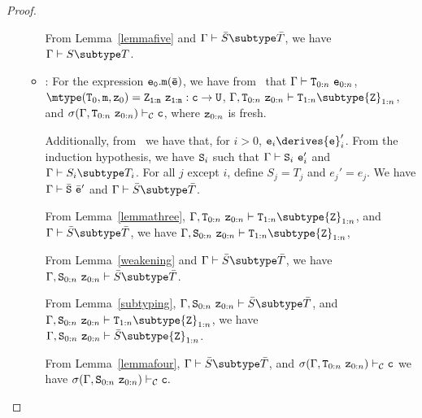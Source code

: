 \begin{proof}
\begin{itemize}
\begin{itemize}
            From Lemma~\ref{lemmafive} and
            $\Gamma \vdash \bar{S} \subtype \bar{T}$, we have
            $\Gamma \vdash S \subtype T$.
   \item
   \RCInvkArg: For the expression ${\tt e_0.m(\bar{e})}$,
            we have from \TInvk\ that
            $\Gamma \vdash {\tt T}_{0:n} \ {\tt e}_{0:n}$,
            $\mtype({\tt T}_0,{\tt m},{\tt z}_0) = 
               \tt {\tt Z}_{1:n}\ {\tt z}_{1:n}:c \rightarrow {\tt U}$,
            $\Gamma, {\tt T}_{0:n}\ {\tt z}_{0:n} \vdash 
                  {\tt T}_{1:n} \subtype {\tt Z}_{1:n}$, and
            $\sigma(\Gamma, {\tt T}_{0:n}\ {\tt z}_{0:n}) \vdash_{\cal C}                          {\tt c}$, 
            where ${\tt z}_{0:n}$ is fresh.

            Additionally, from \RCInvkArg\ we have that, for $i>0$,
            ${\tt e}_i \derives {{\tt e}}_i'$.
            From the induction hypothesis, we have ${\tt S}_i$ such that
            $\Gamma \vdash {\tt S}_i\ {{\tt e}}_i'$ and 
            $\Gamma \vdash S_i \subtype T_i$.
            For all $j$ except $i$, define $S_j = T_j$ and $e_j' = e_j$.
            We have 
            $\Gamma \vdash \bar{\tt S}\ \bar{\tt e}'$ and
            $\Gamma \vdash \bar{S} \subtype \bar{T}$.

            From Lemma~\ref{lemmathree},
            $\Gamma, {\tt T}_{0:n}\ {\tt z}_{0:n} \vdash
                  {\tt T}_{1:n} \subtype {\tt Z}_{1:n}$,
            and $\Gamma \vdash \bar{S} \subtype \bar{T}$, we have
            $\Gamma, {\tt S}_{0:n}\ {\tt z}_{0:n} \vdash
                  {\tt T}_{1:n} \subtype {\tt Z}_{1:n}$,

            From Lemma~\ref{weakening} and 
            $\Gamma \vdash \bar{S} \subtype \bar{T}$, 
            we have 
            $\Gamma, {\tt S}_{0:n}\ {\tt z}_{0:n} \vdash 
                  \bar{S} \subtype \bar{T}$.

            From Lemma~\ref{subtyping},
            $\Gamma, {\tt S}_{0:n}\ {\tt z}_{0:n} \vdash 
                  \bar{S} \subtype \bar{T}$,
            and
            $\Gamma, {\tt S}_{0:n}\ {\tt z}_{0:n} \vdash
                    {\tt T}_{1:n} \subtype {\tt Z}_{1:n}$, 
            we have
            $\Gamma, {\tt S}_{0:n}\ {\tt z}_{0:n} \vdash 
                  \bar{S} \subtype {\tt Z}_{1:n}$.

            From Lemma~\ref{lemmafour}, 
            $\Gamma \vdash \bar{S} \subtype \bar{T}$, and
            $\sigma(\Gamma, {\tt T}_{0:n}\ {\tt z}_{0:n}) \vdash_{\cal C}
                              {\tt c}$
            we have
            $\sigma(\Gamma, {\tt S}_{0:n}\ {\tt z}_{0:n}) \vdash_{\cal C}
                              {\tt c}.$


\end{itemize}
\end{itemize}
\end{proof}
